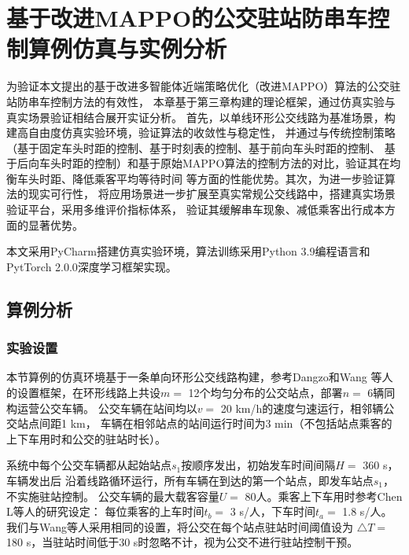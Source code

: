 \chapter{基于改进MAPPO的公交驻站防串车控制算例仿真与实例分析}\label{第4章}

为验证本文提出的基于改进多智能体近端策略优化（改进MAPPO）算法的公交驻站防串车控制方法的有效性，
本章基于第三章构建的理论框架，通过仿真实验与真实场景验证相结合展开实证分析。
首先，以单线环形公交线路为基准场景，构建高自由度仿真实验环境，验证算法的收敛性与稳定性，
并通过与传统控制策略（基于固定车头时距的控制、基于时刻表的控制、基于前向车头时距的控制、
基于后向车头时距的控制）和基于原始MAPPO算法的控制方法的对比，验证其在均衡车头时距、降低乘客平均等待时间
等方面的性能优势。其次，为进一步验证算法的现实可行性，
将应用场景进一步扩展至真实常规公交线路中，搭建真实场景验证平台，采用多维评价指标体系，
验证其缓解串车现象、减低乘客出行成本方面的显著优势。

本文采用PyCharm搭建仿真实验环境，算法训练采用Python 3.9编程语言和PytTorch 2.0.0深度学习框架实现。
\section{算例分析}
\subsection{实验设置}
本节算例的仿真环境基于一条单向环形公交线路构建，参考Dangzo\cite{daganzo2009headway}和Wang
等人\cite{wang2020dynamic}的设置框架，在环形线路上共设$m=$ 12个均匀分布的公交站点，部署$n=$ 6辆同构运营公交车辆。
公交车辆在站间均以$v=$ 20 km/h的速度匀速运行，相邻辆公交站点间距1 km，
车辆在相邻站点的站间运行时间为3 min（不包括站点乘客的上下车用时和公交的驻站时长）。

系统中每个公交车辆都从起始站点$s_1$按顺序发出，初始发车时间间隔$H=$ 360 s，车辆发出后
沿着线路循环运行，所有车辆在到达的第一个站点，即发车站点$s_1$，不实施驻站控制。
公交车辆的最大载客容量$U=$ 80人。乘客上下车用时参考Chen L等人\cite{chen2016real}的研究设定：
每位乘客的上车时间$t_b=$ 3 s/人，下车时间$t_a=$ 1.8 s/人。
我们与Wang等人\cite{wang2020dynamic}采用相同的设置，将公交在每个站点驻站时间阈值设为
$\triangle T =$ 180 s，当驻站时间低于30 s时忽略不计，视为公交不进行驻站控制干预。

